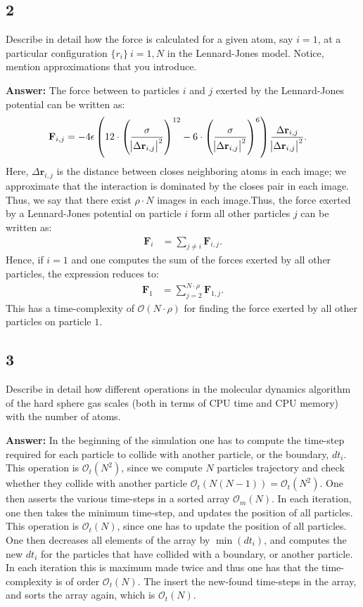 \documentclass[a4paper]{article}
\newcommand{\newparagraph}{\vspace{.5cm}\noindent}
\begin{document}
\subsection*{2}
Describe in detail how the force is calculated for a given atom, say $i = 1$, at a particular configuration $\{r_i\}~ i = 1,N$ in the Lennard-Jones model. Notice, mention approximations that you introduce. 

\newparagraph
\textbf{Answer:} The force between to particles $i$ and $j$ exerted by the Lennard-Jones potential can be written as:
\begin{align*}
    \mathbf{F}_{i,j} &= -4\epsilon\left(12\cdot\left(\frac{\sigma}{\abs{\Delta\mathbf{r}_{i,j}}^2}\right)^{12} - 6\cdot\left(\frac{\sigma}{\abs{\Delta\mathbf{r}_{i,j}}^2}\right)^{6}\right)\frac{\Delta\mathbf{r}_{i,j}}{\abs{\Delta\mathbf{r}_{i,j}}^2}.
\end{align*}Here, $\Delta\mathbf{r}_{i,j}$ is the distance between closes neighboring atoms in each image; we approximate that the interaction is dominated by the closes pair in each image. Thus, we say that there exist $\rho\cdot N$ images in each image.Thus, the force exerted by a Lennard-Jones potential on particle $i$ form all other particles $j$ can be written as:
\begin{align*}
    \mathbf{F}_i &= \sum_{j\neq i}\mathbf{F}_{i,j}.
\end{align*}Hence, if $i = 1$ and one computes the sum of the forces exerted by all other particles, the expression reduces to:
\begin{align*}
    \mathbf{F}_1 &= \sum_{j = 2}^{N\cdot\rho}\mathbf{F}_{1,j}.
\end{align*}This has a time-complexity of $\mathcal{O}(N\cdot\rho)$ for finding the force exerted by all other particles on particle $1$.
\subsection*{3}
Describe in detail how different operations in the molecular dynamics algorithm of the hard sphere gas scales (both in terms of CPU time and CPU memory) with the number of atoms.

\newparagraph
\textbf{Answer:} In the beginning of the simulation one has to compute the time-step required for each particle to collide with another particle, or the boundary, $dt_i$. This operation is $\mathcal{O}_t(N^2)$, since we compute $N$ particles trajectory and check whether they collide with another particle $\mathcal{O}_t(N(N - 1)) = \mathcal{O}_t(N^2)$.
One then asserts the various time-steps in a sorted array $\mathcal{O}_m(N)$. In each iteration, one then takes the minimum time-step, and updates the position of all particles. This operation is $\mathcal{O}_t(N)$, since one has to update the position of all particles. One then decreases all elements of the array by $\min(dt_i)$, and computes the new $dt_i$ for the particles that have collided with a boundary, or another particle.
In each iteration this is maximum made twice and thus one has that the time-complexity is of order $\mathcal{O}_t(N)$. The insert the new-found time-steps in the array, and sorts the array again, which is $\mathcal{O}_t(N)$.
\end{document}
